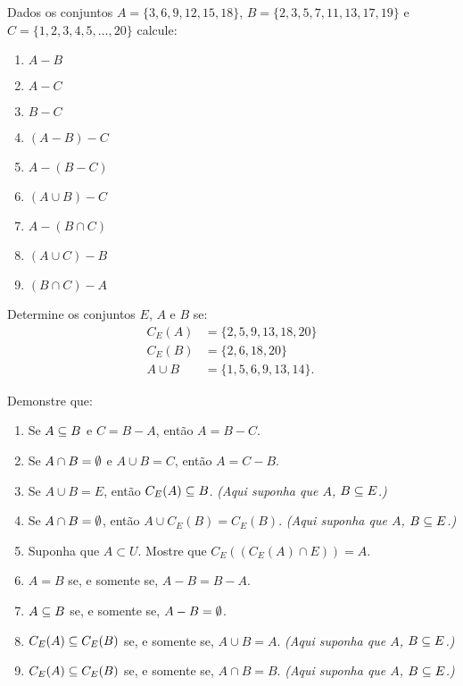 \documentclass[12pt]{exam}
\begin{document}
\questao{} Dados os conjuntos $A = \{3,6,9,12,15,18\}$, $B = \{2,3,5,7,11,13,17,19\}$ e $C = \{1,2,3,4,5,\dots,20\}$ calcule:
\begin{multicols}{3}
    \begin{enumerate}[label={\alph*})]
        \item $A - B$
        \item $A - C$
        \item $B - C$
        \item $(A - B) - C$
        \item $A - (B - C)$
        \item $(A \cup B) - C$
        \item $A - (B \cap C)$
        \item $(A \cup C) - B$
        \item $(B \cap C) - A$
    \end{enumerate}
\end{multicols}

\questao{} Determine os conjuntos $E$, $A$ e $B$ se:
\begin{align*}
    C_E(A) &= \{2, 5, 9, 13, 18, 20\}\\
    C_E(B) &= \{2, 6, 18, 20\}\\
    A \cup B &= \{1, 5, 6, 9, 13, 14\}.
\end{align*}

\newpage
\questao{} Demonstre que:
\begin{enumerate}[label={\alph*})]

    \item Se $A \subseteq B$ e $C = B - A$, ent\~ao $A = B - C$.

    \item Se $A \cap B = \emptyset$ e $A \cup B = C$, ent\~ao $A = C - B$.

    \item Se $A\cup B = E$, ent\~ao $C_E(A) \subseteq B$. \textit{(Aqui suponha que $A$, $B \subseteq E$.)}

    \item Se $A \cap B = \emptyset$, ent\~ao $A \cup C_E(B) = C_E(B)$. \textit{(Aqui suponha que $A$, $B \subseteq E$.)}

    \item Suponha que $A \subset U$. Mostre que $C_E((C_E(A) \cap E)) = A$.

    \item $A = B$ se, e somente se, $A - B = B - A$.

    \item $A \subseteq B$ se, e somente se, $A - B = \emptyset$.

    \item $C_E(A) \subseteq C_E(B)$ se, e somente se, $A \cup B = A$. \textit{(Aqui suponha que $A$, $B \subseteq E$.)}

    \item $C_E(A) \subseteq C_E(B)$ se, e somente se, $A \cap B = B$. \textit{(Aqui suponha que $A$, $B \subseteq E$.)}

\end{enumerate}
\end{document}
